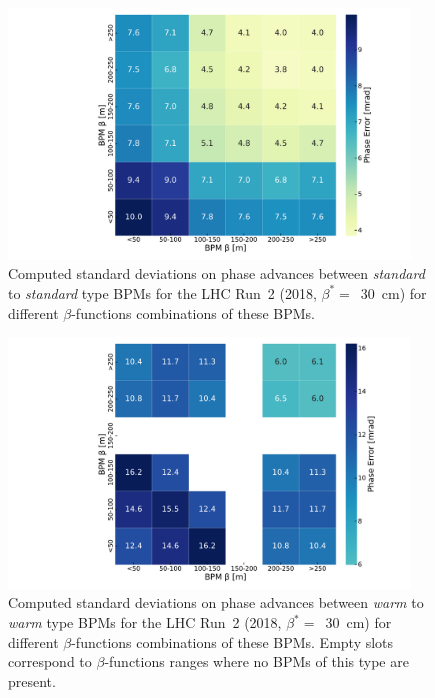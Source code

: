 \begin{figure}[!htb]
    \centering
    \includegraphics*[width=0.95\textwidth]{Figures/Other_Studies/phase_stdev_heatmap_mrad_standard_standard.pdf}
    \caption{Computed standard deviations on phase advances between \textit{standard} to \textit{standard} type BPMs for the LHC Run~\num{2} (\num{2018}, \(\beta^{\ast} =\)~\qty{30}{\centi\meter}) for different \(\beta\)-functions combinations of these BPMs.}
    \label{figure:phase_error_heatmap_standard_bpms}
\end{figure}

\begin{figure}[!htb]
    \centering
    \includegraphics*[width=0.95\textwidth]{Figures/Other_Studies/phase_stdev_heatmap_mrad_warm_warm.pdf}
    \caption{Computed standard deviations on phase advances between \textit{warm} to \textit{warm} type BPMs for the LHC Run~\num{2} (\num{2018}, \(\beta^{\ast} =\)~\qty{30}{\centi\meter}) for different \(\beta\)-functions combinations of these BPMs. Empty slots correspond to \(\beta\)-functions ranges where no BPMs of this type are present.}
    \label{figure:phase_error_heatmap_warm_bpms}
\end{figure}

